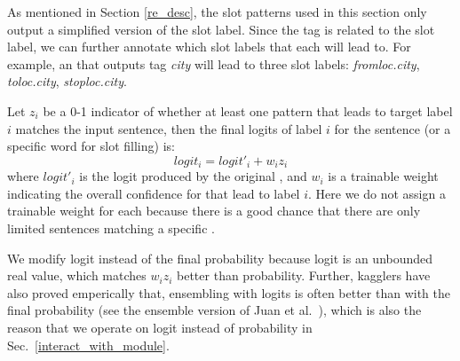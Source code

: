 
As mentioned in Section \ref{re_desc}, the slot \RE patterns used in this section only output a simplified version of the slot label.
Since the \RE tag is related to the slot label, we can further annotate which slot labels that each \RE will lead to.
For example, an \RE that outputs tag \emph{city} will lead to three slot labels: \emph{fromloc.city}, \emph{toloc.city}, \emph{stoploc.city}.

Let $z_i$ be a 0-1 indicator of whether at least one \RE pattern that leads to target label $i$ matches the input sentence, then the final logits of label $i$ for the sentence (or a specific word for slot filling) is:
\begin{equation}
logit_i = logit'_i + w_i z_i
\end{equation}
where $logit'_i$ is the logit produced by the original \NN, and $w_i$ is a trainable weight indicating the overall confidence for \REs that lead to label $i$.
Here we do not assign a trainable weight for each \RE because there is a good chance that there are only limited sentences matching a specific \RE.

We modify logit instead of the final probability because logit is an unbounded real value, which matches $w_i z_i$ better than probability. Further, kagglers have also proved emperically that, ensembling with logits is often better than with the final probability (see the ensemble version of Juan et al.~), which is also the reason that we operate on logit instead of probability in Sec.~\ref{interact_with_module}.
